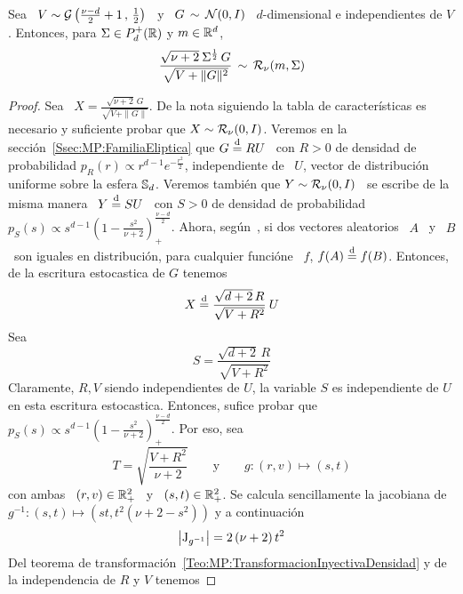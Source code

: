 %
\begin{lema}\label{Lem:MP:StudentRGamma}
%
  Sea \ $V \sim \mathcal{G}\left( \frac{\nu-d}{2}+1 \,  , \, \frac12 \right)$ \ y \ $G \,
  \sim \,  \mathcal{N}(0,I)$ \  $d$-dimensional e independientes  de $V$.  Entonces, para
  $\Sigma \in P_d^+(\mathbb{R})$ y $m \in \mathbb{R}^d$,
  \[
  \frac{\sqrt{\nu+2} \:  \Sigma^{\frac12} \, G}{\sqrt{V  + \|G\|^2}} \,  \sim \,
  \mathcal{R}_\nu( m , \Sigma )
  \]
\end{lema}
\begin{proof}
  Sea \ $X = \frac{\sqrt{\nu+2} \,  G}{\sqrt{V + \|G\|}}$.  De la nota siguiendo
  la tabla  de caracter\'isticas  es necesario y  suficiente probar que  $X \sim
  \mathcal{R}_\nu(0,I)$.   Veremos en  la secci\'on~\ref{Ssec:MP:FamiliaEliptica}  que $G
  \stackrel{\mathrm{d}}{=} R U$ \ con $R >  0$ de densidad de probabilidad $p_R(r) \propto r^{d-1}
  e^{-\frac{r^2}{2}}$, independiente de \ $U$, vector de distribuci\'on uniforme
  sobre la  esfera $\mathbb{S}_d$.  Veremos tambi\'en  que $Y \sim  \mathcal{R}_\nu(0,I)$ \ se
  escribe de  la misma manera  \ $Y  \stackrel{\mathrm{d}}{=} S U$  \ con $S  > 0$ de  densidad de
  probabilidad   $p_S(s)   \propto   s^{d-1}   \left(  1   -   \frac{s^2}{\nu+2}
  \right)_+^{\frac{\nu-d}{2}}$.   Ahora, seg\'un~\cite{FanKot90, Zol86},  si dos
  vectores aleatorios  \ $A$  \ y \  $B$ \  son iguales en  distribuci\'on, para
  cualquier  funci\'one \  $f$, $f(A)  \stackrel{\mathrm{d}}{=} f(B)$.  Entonces, de  la escritura
  estocastica de $G$ tenemos
  \[
  X \stackrel{\mathrm{d}}{=} \frac{\sqrt{d+2} \, R}{\sqrt{V + R^2}} \: U
  \]
  Sea
  \[
  S = \frac{\sqrt{d+2} \, R}{\sqrt{V + R^2}}
  \]
  Claramente,  $R,  V$  siendo  independientes   de  $U$,  la  variable  $S$  es
  independiente de  $U$ en esta  escritura estocastica. Entonces,  sufice probar
  que    $p_S(s)    \propto     s^{d-1}    \left(    1    -    \frac{s^2}{\nu+2}
  \right)_+^{\frac{\nu-d}{2}}$. Por eso, sea
  \[
  T = \sqrt{\frac{V+R^2}{\nu+2}} \qquad \mbox{y} \qquad g: (r,v) \mapsto (s,t)
  \]
  con ambas  \ $(r,v) \in  \mathbb{R}_+^2$ \ y  \ $(s,t) \in \mathbb{R}_+^2$.   Se calcula
  sencillamente  la  jacobiana  de  $g^{-1}:  (s,t)  \mapsto  \left(  s t  ,  t^2
    (\nu+2-s^2) \right)$ y a continuaci\'on
  \[
  \left| \operatorname{J}_{g^{-1}} \right| = 2 \, (\nu+2) \, t^2
  \]
  Del teorema de transformaci\'on~\ref{Teo:MP:TransformacionInyectivaDensidad} y
  de la independencia de $R$ y $V$ tenemos

\end{proof}
